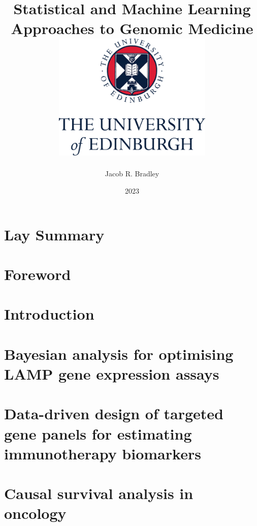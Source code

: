 \documentclass[12pt,twoside,openright]{report}
\title{
Statistical and Machine Learning Approaches to Genomic Medicine \vspace{100pt} \\ 
\includegraphics[width=3in]{figures/misc/edi_uni_logo.png} \\
\vspace{50pt}
}
\author{
Jacob R. Bradley
}
\date{2023}
\theoremstyle{definition}
\def\dobib{
    
}
\begin{document}
\def\dobib{} %
\lstset{showstringspaces=false} %

\maketitle

\declaration

\dedication{To Morton...}



\chapter*{Lay Summary}
\label{chap:laysummary}



\chapter*{Foreword}
\label{chap:foreword}


\printglossary[type=\acronymtype]

\tableofcontents


\chapter{Introduction \label{chap:intro}}



\chapter{Bayesian analysis for optimising LAMP gene expression assays \label{chap:lamp_modelling}}


\chapter{Data-driven design of targeted gene panels for estimating immunotherapy biomarkers \label{chap:tmb_estimation}}


\chapter{Causal survival analysis in oncology\label{chap:causal_genomics}}

\end{document}
